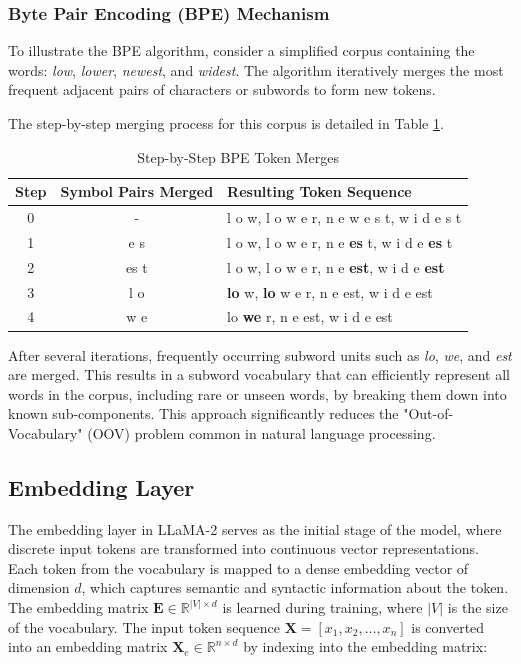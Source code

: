 \subsubsection{Byte Pair Encoding (BPE) Mechanism}
To illustrate the BPE algorithm, consider a simplified corpus containing the words: \textit{low}, \textit{lower}, \textit{newest}, and \textit{widest}. The algorithm iteratively merges the most frequent adjacent pairs of characters or subwords to form new tokens.



The step-by-step merging process for this corpus is detailed in Table \ref{tab:bpe_example}.

\begin{table}[htbp]
    \centering
    \caption{Step-by-Step BPE Token Merges}
    \label{tab:bpe_example}
    \begin{tabular}{ccl}
        \toprule
        \textbf{Step} & \textbf{Symbol Pairs Merged} & \textbf{Resulting Token Sequence} \\
        \midrule
        0 & - & l o w, l o w e r, n e w e s t, w i d e s t \\
        1 & e s & l o w, l o w e r, n e \textbf{es} t, w i d e \textbf{es} t \\
        2 & es t & l o w, l o w e r, n e \textbf{est}, w i d e \textbf{est} \\
        3 & l o & \textbf{lo} w, \textbf{lo} w e r, n e est, w i d e est \\
        4 & w e & lo \textbf{we} r, n e est, w i d e est \\
        \bottomrule
    \end{tabular}
\end{table}

After several iterations, frequently occurring subword units such as \textit{lo}, \textit{we}, and \textit{est} are merged. This results in a subword vocabulary that can efficiently represent all words in the corpus, including rare or unseen words, by breaking them down into known sub-components. This approach significantly reduces the "Out-of-Vocabulary" (OOV) problem common in natural language processing.




\subsection{Embedding Layer}
The embedding layer in LLaMA-2 serves as the initial stage of the model, where discrete input tokens are transformed into continuous vector representations. Each token from the vocabulary is mapped to a dense embedding vector of dimension $d$, which captures semantic and syntactic information about the token. The embedding matrix $\mathbf{E} \in \mathbb{R}^{|V| \times d}$ is learned during training, where $|V|$ is the size of the vocabulary. The input token sequence $\mathbf{X} = [x_1, x_2, \dots, x_n]$ is converted into an embedding matrix $\mathbf{X}_e \in \mathbb{R}^{n \times d}$ by indexing into the embedding matrix:

